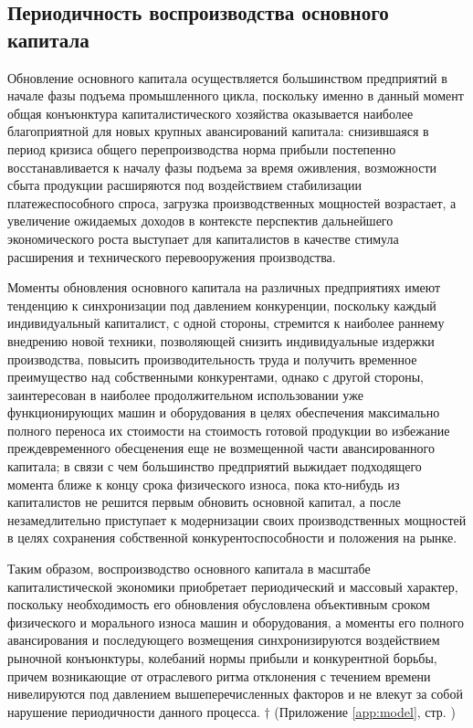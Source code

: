 \subsection{Периодичность воспроизводства основного капитала}
Обновление основного капитала осуществляется большинством предприятий в начале фазы подъема промышленного цикла, поскольку именно в данный момент общая конъюнктура капиталистического хозяйства оказывается наиболее благоприятной для новых крупных авансирований капитала: снизившаяся в период кризиса общего перепроизводства норма прибыли постепенно восстанавливается к началу фазы подъема за время оживления, возможности сбыта продукции расширяются под воздействием стабилизации платежеспособного спроса, загрузка производственных мощностей возрастает, а увеличение ожидаемых доходов в контексте перспектив дальнейшего экономического роста выступает для капиталистов в качестве стимула расширения и технического перевооружения производства.

Моменты обновления основного капитала на различных предприятиях имеют тенденцию к синхронизации под давлением конкуренции, поскольку каждый индивидуальный капиталист, с одной стороны, стремится к наиболее раннему внедрению новой техники, позволяющей снизить индивидуальные издержки производства, повысить производительность труда и получить временное преимущество над собственными конкурентами, однако с другой стороны, заинтересован в наиболее продолжительном использовании уже функционирующих машин и оборудования в целях обеспечения максимально полного переноса их стоимости на стоимость готовой продукции во избежание преждевременного обесценения еще не возмещенной части авансированного капитала; в связи с чем большинство предприятий выжидает подходящего момента ближе к концу срока физического износа, пока кто-нибудь из капиталистов не решится первым обновить основной капитал, а после незамедлительно приступает к модернизации своих производственных мощностей в целях сохранения собственной конкурентоспособности и положения на рынке.

Таким образом, воспроизводство основного капитала в масштабе капиталистической экономики приобретает периодический и массовый характер, поскольку необходимость его обновления обусловлена объективным сроком физического и морального износа машин и оборудования, а моменты его полного авансирования и последующего возмещения синхронизируются воздействием рыночной конъюнктуры, колебаний нормы прибыли и конкурентной борьбы, причем возникающие от отраслевого ритма отклонения с течением времени нивелируются под давлением вышеперечисленных факторов и не влекут за собой нарушение периодичности данного процесса. $\dagger$ (Приложение \ref{app:model}, стр. \pageref{app:model})

